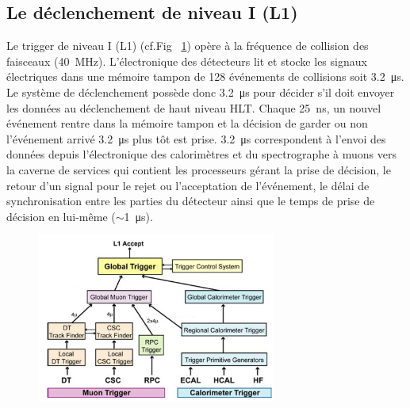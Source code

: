 \subsection{Le déclenchement de niveau I (L1)}
Le trigger de niveau I (L1) (cf.Fig~ \ref{L1}) opère à la fréquence de collision des faisceaux (\SI{40}{\mega\hertz}). L'électronique des détecteurs lit et stocke les  signaux électriques dans une mémoire tampon de \num{128} événements de collisions soit \SI{3.2}{\micro\second}. Le système de déclenchement possède donc \SI{3.2}{\micro\second} pour  décider s'il doit envoyer les données au déclenchement de haut niveau HLT. Chaque \SI{25}{\nano\second}, un nouvel événement rentre dans la mémoire tampon et la décision de garder ou non l'événement arrivé \SI{3.2}{\micro\second} plus tôt est prise. \SI{3.2}{\micro\second} correspondent à l'envoi des données depuis l'électronique des calorimètres et du spectrographe à muons vers la caverne de services qui contient les processeurs gérant la prise de décision, le retour d'un signal pour le rejet ou l'acceptation de l'événement, le délai de synchronisation entre les parties du détecteur ainsi que le temps de prise de décision en lui-même ($\sim$\SI{1}{\micro\second}). 

	  \begin{figure}[ht!]
	\centering
	\includegraphics[width=0.70\textwidth]{CMS/L1.png}
	\label{L1}
\end{figure}

